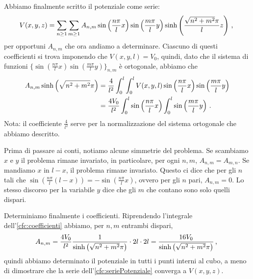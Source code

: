 \documentclass[../main.tex]{subfiles}
\begin{document}
Abbiamo finalmente scritto il potenziale come serie:
\begin{equation}\label{cfc:seriePotenziale}
	V(x,y,z)=\sum_{n\geq 1} \sum_{m\geq 1} A_{n,m} \sin\left( \frac{n\pi}{l}x\right) \sin \left(\frac{m\pi}{l}y\right) \sinh\left(\frac{\sqrt{n^2+m^2}\pi}{l}z\right)\, \text{, }
\end{equation}
per opportuni $A_{n,m}$ che ora andiamo a determinare. Ciascuno di questi coefficienti si trova imponendo che $V(x,y,l)=V_0$, quindi, dato che il sistema di funzioni $\{\sin\left( \frac{n\pi}{l}x\right) \sin \left(\frac{m\pi}{l}y\right)\}_{n,m}$ è ortogonale, abbiamo che
\begin{align}\label{cfc:coefficienti}
	A_{n,m}\sinh\left(\sqrt{n^2+m^2}\pi\right)&=\frac{4}{l^2}\int_0^l\int_0^l V(x,y,l)\sin\left( \frac{n\pi}{l}x\right) \sin \left(\frac{m\pi}{l}y\right)\\
	&=\frac{4V_0}{l^2}\int_0^l \sin\left( \frac{n\pi}{l}x\right) \int_0^l \sin \left(\frac{m\pi}{l}y\right)\, \text{. }
\end{align}
Nota: il coefficiente $\frac{4}{l^2}$ serve per la normalizzazione del sistema ortogonale che abbiamo descritto.

Prima di passare ai conti, notiamo alcune simmetrie del problema. Se scambiamo $x$ e $y$ il problema rimane invariato, in particolare, per ogni $n,m$, $A_{n,m}=A_{m,n}$. Se mandiamo $x$ in $l-x$, il problema rimane invariato. Questo ci dice che per gli $n$ tali che $\sin \left( \frac{n\pi}{l}(l-x)\right) = - \sin\left( \frac{n\pi}{l}x\right)$, ovvero per gli $n$ pari, $A_{n,m}=0$. Lo stesso discorso per la variabile $y$ dice che gli $m$ che contano sono solo quelli dispari.

Determiniamo finalmente i coefficienti. Riprendendo l'integrale dell'\cref{cfc:coefficienti} abbiamo, per $n,m$ entrambi dispari,
\[
	A_{n,m}=\frac{4V_0}{l^2}\frac{1}{\sinh\left(\sqrt{n^2+m^2}\pi\right)}\cdot 2l \cdot 2l=\frac{16V_0}{\sinh\left(\sqrt{n^2+m^2}\pi\right)}\, \text{, }
\]
quindi abbiamo determinato il potenziale in tutti i punti interni al cubo, a meno di dimostrare che la serie dell'\cref{cfc:seriePotenziale} converga a $V(x,y,z)$.
\end{document}
